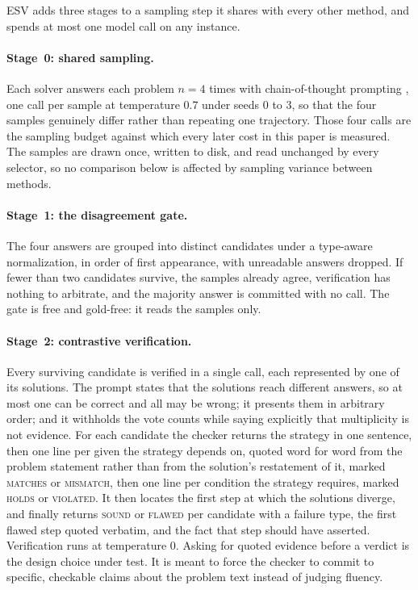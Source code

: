 \documentclass[letterpaper]{article} %
\newcommand{\method}{\textsc{ESV}}   %
\begin{document}
\method{} adds three stages to a sampling step it shares with every other
method, and spends at most one model call on any instance.

\paragraph{Stage~0: shared sampling.}
Each solver answers each problem $n = 4$ times with chain-of-thought prompting
\cite{wei2022chain}, one call per sample at temperature $0.7$ under seeds $0$
to $3$, so that the four samples genuinely differ rather than repeating one
trajectory. Those four calls are the sampling budget against which every
later cost in this paper is measured. The samples are drawn once, written to
disk, and read unchanged by every selector, so no comparison below is affected
by sampling variance between methods.

\paragraph{Stage~1: the disagreement gate.}
The four answers are grouped into distinct candidates under a type-aware
normalization, in order of first appearance, with unreadable answers dropped.
If fewer than two candidates survive, the samples already agree, verification
has nothing to arbitrate, and the majority answer is committed with no call.
The gate is free and gold-free: it reads the samples only.

\paragraph{Stage~2: contrastive verification.}
Every surviving candidate is verified in a single call, each represented by one
of its solutions. The prompt states that the solutions reach different answers,
so at most one can be correct and all may be wrong; it presents them in
arbitrary order; and it withholds the vote counts while saying explicitly that
multiplicity is not evidence. For each candidate the checker returns the
strategy in one sentence, then one line per given the strategy depends on,
quoted word for word from the problem statement rather than from the solution's
restatement of it, marked \textsc{matches} or \textsc{mismatch}, then one
line per condition the strategy requires, marked \textsc{holds} or
\textsc{violated}. It then locates the first step at which the solutions
diverge, and finally returns \textsc{sound} or \textsc{flawed} per candidate
with a failure type, the first flawed step quoted verbatim, and the fact that
step should have asserted. Verification runs at temperature $0$. Asking for
quoted evidence before a verdict is the design choice under test. It is meant
to force the checker to commit to specific, checkable claims about the problem
text instead of judging fluency.
\end{document}
